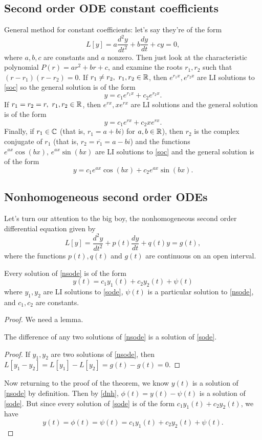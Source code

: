 \subsection{Second order ODE constant coefficients}
General method for constant coefficients: let's say they're of the form 
\begin{equation}\label{soc}
    L[y]=a \frac{d^2y}{dt^2}+b \frac{dy}{dt}+cy=0,
\end{equation}
where $a,b,c$ are constants and $a$ nonzero. Then just look at the characteristic polynomial $P(r)=ar^2+br+c$, and examine the roots $r_1,r_2$ such that $(r-r_1)(r-r_2)=0$. If $r_1\neq r_2,\ r_1,r_2\in \mathbb{R}$, then $e^{r_1x},e^{r_2x}$ are LI solutions to \cref{soc} so the general solution is of the form \[
y=c_1e^{r_1x}+c_2e^{r_2x}.
\] If $r_1=r_2=r, \ r_1,r_2\in \mathbb{R}$, then $e^{rx},xe^{rx}$ are LI solutions and the general solution is of the form \[
y=c_1e^{rx}+c_2xe^{rx}.
\] Finally, if $r_1\in \mathbb{C}$ (that is, $r_1=a+bi)$ for $a,b\in \mathbb{R}$), then $r_2$ is the complex conjugate of $r_1$ (that is, $r_2=\overline{r_1}=a-bi$) and the functions $e^{ax}\cos(bx),\,e^{ax}\sin(bx)$ are LI solutions to \cref{soc} and the general solution is of the form \[
y=c_1e^{ax}\cos(bx)+c_2e^{ax}\sin(bx).
\] 
\subsection{Nonhomogeneous second order ODEs}
Let's turn our attention to the big boy, the nonhomogeneous second order differential equation given by
\begin{equation}\label{nsode}
    L[y]=\frac{d^2y}{dt^2}+p(t) \frac{dy}{dt}+q(t)y=g(t),
\end{equation}
where the functions $p(t),q(t)$ and $g(t)$ are continuous on an open interval.
\begin{theorem}
    Every solution of \cref{nsode} is of the form \[
        y(t)=c_1y_1(t)+c_2y_2(t)+\psi(t)
    \] where $y_1,y_2$ are LI solutions to \cref{sode}, $\psi(t)$ is a particular solution to \cref{nsode}, and $c_1,c_2$ are constants.
\end{theorem}
\begin{proof}
    We need a lemma.
    \begin{lemma}\label{dnh}
    The difference of any two solutions of \cref{nsode} is a solution of \cref{sode}.
\end{lemma}
\begin{proof}
    If $y_1,y_2$ are two solutions of \cref{nsode}, then $L[y_1-y_2]=L[y_1]-L[y_2]=g(t)-g(t)=0.$
\end{proof}
Now returning to the proof of the theorem, we know $y(t)$ is a solution of \cref{nsode} by definition. Then by \cref{dnh}, $\phi (t)=y(t)-\psi(t)$ is a solution of \cref{sode}. But since every solution of \cref{sode} is of the form $c_1y_1(t)+c_2y_2(t)$, we have \[
    y(t)=\phi(t)=\psi(t)=c_1y_1(t)+c_2y_2(t)+\psi(t).
\] 
\end{proof}
